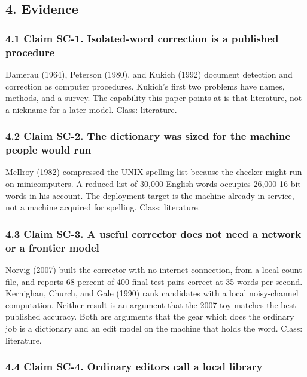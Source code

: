 \documentclass[
  10pt,
]{article}
\begin{document}
\subsection{4. Evidence}\label{evidence}

\subsubsection{4.1 Claim SC-1. Isolated-word correction is a published
procedure}\label{claim-sc-1.-isolated-word-correction-is-a-published-procedure}

Damerau (1964), Peterson (1980), and Kukich (1992) document detection
and correction as computer procedures. Kukich's first two problems have
names, methods, and a survey. The capability this paper points at is
that literature, not a nickname for a later model. Class: literature.

\subsubsection{4.2 Claim SC-2. The dictionary was sized for the machine
people would
run}\label{claim-sc-2.-the-dictionary-was-sized-for-the-machine-people-would-run}

McIlroy (1982) compressed the UNIX spelling list because the checker
might run on minicomputers. A reduced list of 30,000 English words
occupies 26,000 16-bit words in his account. The deployment target is
the machine already in service, not a machine acquired for spelling.
Class: literature.

\subsubsection{4.3 Claim SC-3. A useful corrector does not need a
network or a frontier
model}\label{claim-sc-3.-a-useful-corrector-does-not-need-a-network-or-a-frontier-model}

Norvig (2007) built the corrector with no internet connection, from a
local count file, and reports 68 percent of 400 final-test pairs correct
at 35 words per second. Kernighan, Church, and Gale (1990) rank
candidates with a local noisy-channel computation. Neither result is an
argument that the 2007 toy matches the best published accuracy. Both are
arguments that the gear which does the ordinary job is a dictionary and
an edit model on the machine that holds the word. Class: literature.

\subsubsection{4.4 Claim SC-4. Ordinary editors call a local
library}\label{claim-sc-4.-ordinary-editors-call-a-local-library}
\end{document}
